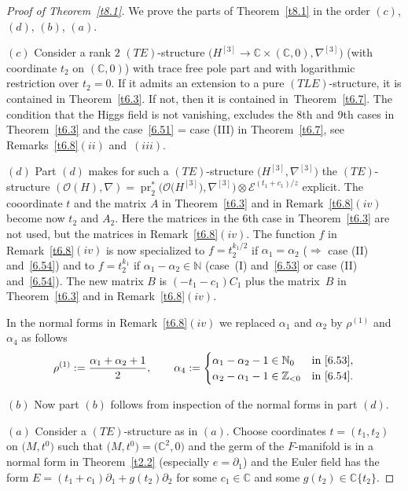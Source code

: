 \documentclass[10pt,a4paper]{amsart}
\numberwithin{equation}{section}
\numberwithin{figure}{section}
\newcommand{\N}{{\mathbb N}}
\newcommand{\Z}{{\mathbb Z}}
\newcommand{\C}{{\mathbb C}}
\newcommand{\EE}{{\mathcal E}}
\newcommand{\OO}{{\mathcal O}}
\newcommand{\paa}{\partial}
\newcommand{\nnn}{\nabla}
\DeclareMathOperator{\pr}{pr}
\begin{document}
\begin{proof}[Proof of Theorem~\ref{t8.1}]
We prove the parts of Theorem~\ref{t8.1}
in the order $(c)$, $(d)$, $(b)$, $(a)$.

$(c)$ Consider a rank $2$ $(TE)$-structure
$\big(H^{[3]}\to\C\times(\C,0),\nnn^{[3]}\big)$
(with coordinate $t_2$ on $(\C,0)$)
with trace free pole part and with logarithmic
restriction over $t_2=0$. If it admits an
extension to a pure $(TLE)$-structure, it is contained in Theo\-rem~\ref{t6.3}. If not, then it is contained in~Theorem~\ref{t6.7}. The condition that the Higgs field
is not vanishing, excludes the 8th and 9th cases in Theo\-rem~\ref{t6.3} and the case~\eqref{6.51} = case (III)
in Theorem~\ref{t6.7}, see Remarks~\ref{t6.8}$(ii)$ and~$(iii)$.

$(d)$ Part $(d)$ makes for such a $(TE)$-structure
$\big(H^{[3]},\nnn^{[3]}\big)$ the $(TE)$-structure
$(\OO(H),\nnn)=\pr_2^*\big(\OO\big(H^{[3]}\big),\nnn^{[3]}\big)\otimes
\EE^{(t_1+c_1)/z}$ explicit.
The cooordinate $t$ and the matrix $A$ in Theorem~\ref{t6.3}
and in Remark~\ref{t6.8}$(iv)$ become now $t_2$ and $A_2$.
Here the matrices in the 6th case in Theorem~\ref{t6.3}
are not used, but the matrices in Remark~\ref{t6.8}$(iv)$.
The function $f$ in Remark~\ref{t6.8}$(iv)$ is now
specialized to $f=t_2^{k_1/2}$ if $\alpha_1=\alpha_2$
($\Rightarrow$ case (II) and~\eqref{6.54})
and to $f=t_2^{k_1}$ if $\alpha_1-\alpha_2\in\N$
(case~(I) and~\eqref{6.53} or case (II) and~\eqref{6.54}).
The new matrix $B$ is $(-t_1-c_1)C_1$ plus the matrix~$B$ in Theorem~\ref{t6.3} and in Remark~\ref{t6.8}$(iv)$.

In the normal forms in Remark~\ref{t6.8}$(iv)$ we replaced
$\alpha_1$ and $\alpha_2$ by $\rho^{(1)}$ and $\alpha_4$
as follows
\begin{gather*}%
\rho^{(1)}:=\frac{\alpha_1+\alpha_2+1}{2},\qquad
\alpha_4:=\begin{cases}
\alpha_1-\alpha_2-1\in\N_0&\text{in}~\eqref{6.53},
\\
\alpha_2-\alpha_1-1\in\Z_{<0}&\text{in}~\eqref{6.54}.
\end{cases}
\end{gather*}

$(b)$ Now part $(b)$ follows from inspection of the normal forms
in part $(d)$.

$(a)$ Consider a $(TE)$-structure
as in $(a)$. Choose coordinates $t=(t_1,t_2)$ on $\big(M,t^0\big)$
such that $\big(M,t^0\big)=\big(\C^2,0\big)$ and the germ of the $F$-manifold
is in a normal form in Theorem~\ref{t2.2}
(especially $e=\paa_1$)
and the Euler field has the form $E=(t_1+c_1)\paa_1
+g(t_2)\paa_2$ for some $c_1\in\C$ and some
$g(t_2)\in\C\{t_2\}$.


\end{proof}
\end{document}
